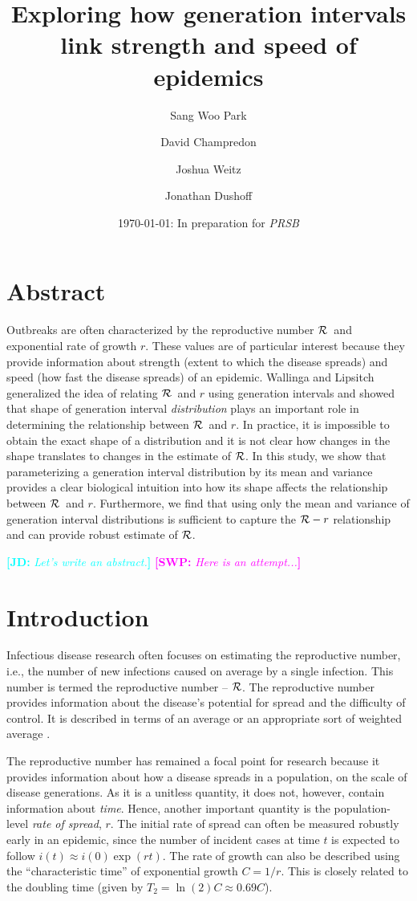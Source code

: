 \documentclass[12pt]{article}
\title{Exploring how generation intervals link strength and speed of epidemics}
\author{Sang Woo Park \and David Champredon \and Joshua Weitz \and Jonathan Dushoff}
\date{\today: In preparation for \emph{PRSB}}
\newcommand{\RR}{\ensuremath{{\cal R}}}
\newcommand{\Tc}{\ensuremath{C}}
\newcommand{\comment}[3]{\textcolor{#1}{\textbf{[#2: }\textit{#3}\textbf{]}}}
\newcommand{\jd}[1]{\comment{cyan}{JD}{#1}}
\newcommand{\swp}[1]{\comment{magenta}{SWP}{#1}}
\begin{document}
\maketitle

\section*{Abstract}

Outbreaks are often characterized by the reproductive number \RR\ and exponential rate of growth $r$.
These values are of particular interest because they provide information about strength (extent to which the disease spreads) and speed (how fast the disease spreads) of an epidemic.
Wallinga and Lipsitch generalized the idea of relating \RR\ and $r$ using generation intervals and showed that shape of generation interval \emph{distribution} plays an important role in determining the relationship between \RR\ and $r$.
In practice, it is impossible to obtain the exact shape of a distribution and it is not clear how changes in the shape translates to changes in the estimate of \RR.
In this study, we show that parameterizing a generation interval distribution by its mean and variance provides a clear biological intuition into how its shape affects the relationship between \RR\ and $r$.
Furthermore, we find that using only the mean and variance of generation interval distributions is sufficient to capture the $\RR-r$ relationship and can provide robust estimate of \RR.

\jd{Let's write an abstract.}
\swp{Here is an attempt...}

\section{Introduction}

Infectious disease research often focuses on estimating the reproductive number, i.e., the number of new infections caused on average by a single infection.
This number is termed the reproductive number -- \RR.
The reproductive number provides information about the disease's potential for spread and the difficulty of control.
It is described in terms of an average \cite{AndeMay91} or an appropriate sort of weighted average \cite{DiekHees90}.

The reproductive number has remained a focal point for research because it provides information about how a disease spreads in a population, on the scale of disease generations.
As it is a unitless quantity, it does not, however, contain information about \emph{time}.
Hence, another important quantity is the population-level \emph{rate of spread}, $r$. The initial rate of spread can often be measured robustly early in an epidemic, since the number of incident cases at time $t$ is expected to follow $i(t) \approx i(0) \exp(r t)$. The rate of growth can also be described using the ``characteristic time'' of exponential growth $\Tc = 1/r$. This is closely related to the doubling time (given by $T_2 = \ln(2) \Tc \approx 0.69 \Tc$).
\end{document}
